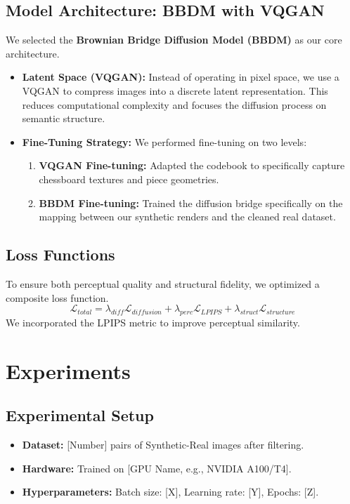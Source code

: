 \documentclass[12pt,a4paper]{article}
\begin{document}
\subsection{Model Architecture: BBDM with VQGAN}
We selected the \textbf{Brownian Bridge Diffusion Model (BBDM)} \cite{bbdm2023} as our core architecture.
\begin{itemize}
    \item \textbf{Latent Space (VQGAN):} Instead of operating in pixel space, we use a VQGAN \cite{vqgan2021} to compress images into a discrete latent representation. This reduces computational complexity and focuses the diffusion process on semantic structure.
    \item \textbf{Fine-Tuning Strategy:} We performed fine-tuning on two levels:
    \begin{enumerate}
        \item \textbf{VQGAN Fine-tuning:} Adapted the codebook to specifically capture chessboard textures and piece geometries.
        \item \textbf{BBDM Fine-tuning:} Trained the diffusion bridge specifically on the mapping between our synthetic renders and the cleaned real dataset.
    \end{enumerate}
\end{itemize}

\subsection{Loss Functions}
\label{subsec:loss}
To ensure both perceptual quality and structural fidelity, we optimized a composite loss function.
\begin{equation}
    \mathcal{L}_{total} = \lambda_{diff} \mathcal{L}_{diffusion} + \lambda_{perc} \mathcal{L}_{LPIPS} + \lambda_{struct} \mathcal{L}_{structure}
\end{equation}
We incorporated the LPIPS metric \cite{lpips2018} to improve perceptual similarity.

\section{Experiments}
\label{sec:experiments}

\subsection{Experimental Setup}
\begin{itemize}
    \item \textbf{Dataset:} [Number] pairs of Synthetic-Real images after filtering.
    \item \textbf{Hardware:} Trained on [GPU Name, e.g., NVIDIA A100/T4].
    \item \textbf{Hyperparameters:} Batch size: [X], Learning rate: [Y], Epochs: [Z].
\end{itemize}
\end{document}
